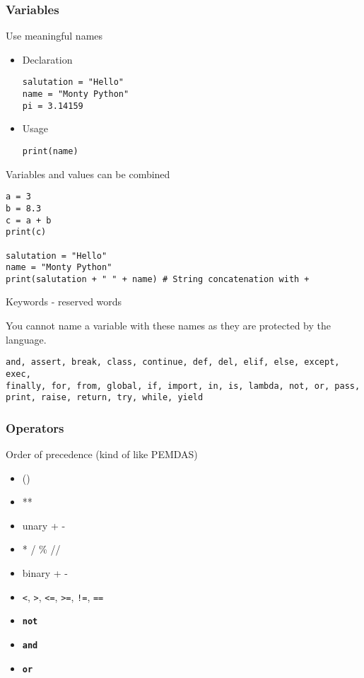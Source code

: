 \documentclass[10pt, a4paper]{beamer} %
\begin{document}
\begin{frame}\frametitle{Variables}
	\begin{examples}
		Use meaningful names
		\begin{itemize}
			\item Declaration
			      \begin{lstlisting}
salutation = "Hello"
name = "Monty Python"
pi = 3.14159
    \end{lstlisting}
			\item Usage
			      \begin{lstlisting}
print(name)
    \end{lstlisting}
		\end{itemize}

	\end{examples}
	\framebreak
	\begin{block}{Variables and values can be combined}
		\begin{lstlisting}
a = 3
b = 8.3
c = a + b
print(c)

salutation = "Hello"
name = "Monty Python"
print(salutation + " " + name) # String concatenation with +
    \end{lstlisting}
	\end{block}
	\framebreak
	\begin{block}{Keywords - reserved words}

		You cannot name a variable with these names as they are protected by the language.

		\begin{lstlisting}
and, assert, break, class, continue, def, del, elif, else, except, exec,
finally, for, from, global, if, import, in, is, lambda, not, or, pass,
print, raise, return, try, while, yield
\end{lstlisting}

	\end{block}
\end{frame}

\begin{frame}[t, fragile]\frametitle{Operators}
	\begin{block}{Order of precedence (kind of like PEMDAS)}
		\begin{itemize}
			\item ()
			\item **
			\item unary + -
			\item *  /  \% //
			\item binary + -
			\item \texttt{<}, \texttt{>}, \texttt{<=}, \texttt{>=}, \texttt{!=}, \texttt{==}
			\item \textbf{\texttt{\color{mDarkBlue}not}}
			\item \textbf{\texttt{\color{mDarkBlue}and}}
			\item \textbf{\texttt{\color{mDarkBlue}or}}
		\end{itemize}
	\end{block}

\end{frame}
\end{document}
